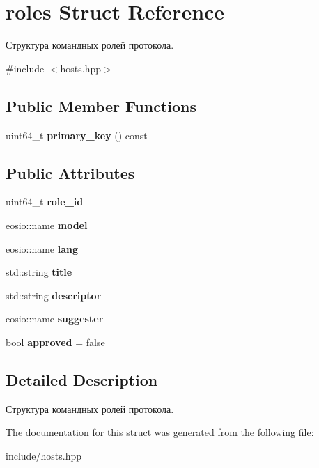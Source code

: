 \hypertarget{structroles}{}\section{roles Struct Reference}
\label{structroles}


Структура командных ролей протокола.  




{\ttfamily \#include $<$hosts.\+hpp$>$}

\subsection*{Public Member Functions}
\begin{DoxyCompactItemize}
\item 
\mbox{\label{structroles_a77e285402e8f705d872e8f972d60da5d}} 
uint64\+\_\+t {\bfseries primary\+\_\+key} () const
\end{DoxyCompactItemize}
\subsection*{Public Attributes}
\begin{DoxyCompactItemize}
\item 
\mbox{\label{structroles_a09f3a5f9d5f49dc5f42dd341c3625921}} 
uint64\+\_\+t {\bfseries role\+\_\+id}
\item 
\mbox{\label{structroles_a1636a96590f017868b52e4fb0981b122}} 
eosio\+::name {\bfseries model}
\item 
\mbox{\label{structroles_ad862fbb4086a677484e0b08e44c46b4b}} 
eosio\+::name {\bfseries lang}
\item 
\mbox{\label{structroles_af0b8c91fa6b8352837b7dbcec1ce1103}} 
std\+::string {\bfseries title}
\item 
\mbox{\label{structroles_ac00f8989da077196f53ef6b114d203f0}} 
std\+::string {\bfseries descriptor}
\item 
\mbox{\label{structroles_a386104c4d56af816a3c4c486c521666b}} 
eosio\+::name {\bfseries suggester}
\item 
\mbox{\label{structroles_ac5d3a4e7af37f855dc3c7772794d7cdb}} 
bool {\bfseries approved} = false
\end{DoxyCompactItemize}


\subsection{Detailed Description}
Структура командных ролей протокола. 

The documentation for this struct was generated from the following file\+:\begin{DoxyCompactItemize}
\item 
include/hosts.\+hpp\end{DoxyCompactItemize}
